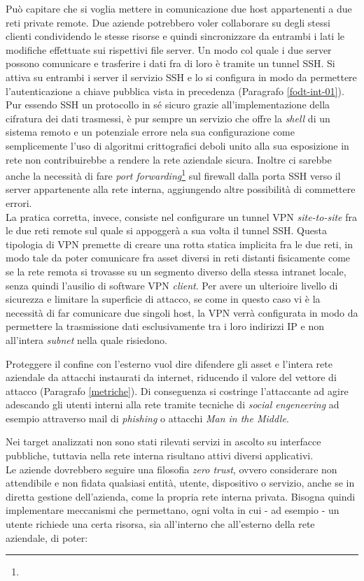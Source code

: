 \documentclass[target=bach,aauheader=]{thud}
\begin{document}
Può capitare che si voglia mettere in comunicazione due host appartenenti a due reti private remote. Due aziende potrebbero voler collaborare su degli stessi clienti condividendo le stesse risorse e quindi sincronizzare da entrambi i lati le modifiche effettuate sui rispettivi file server. Un modo col quale i due server possono comunicare e trasferire i dati fra di loro è tramite un tunnel SSH. Si attiva su entrambi i server il servizio SSH e lo si configura in modo da permettere l'autenticazione a chiave pubblica vista in precedenza (Paragrafo \ref{fodt-int-01}). Pur essendo SSH un protocollo in sé sicuro grazie all'implementazione della cifratura dei dati trasmessi, è pur sempre un servizio che offre la \textit{shell} di un sistema remoto e un potenziale errore nela sua configurazione come semplicemente l'uso di algoritmi crittografici deboli unito alla sua esposizione in rete non contribuirebbe a rendere la rete aziendale sicura. Inoltre ci sarebbe anche la necessità di fare \textit{port forwarding}\footnote{} sul firewall dalla porta SSH verso il server appartenente alla rete interna, aggiungendo altre possibilità di commettere errori.
\\ La pratica corretta, invece, consiste nel configurare un tunnel VPN \textit{site-to-site} fra le due reti remote sul quale si appoggerà a sua volta il tunnel SSH. Questa tipologia di VPN premette di creare una rotta statica implicita fra le due reti, in modo tale da poter comunicare fra asset diversi in reti distanti fisicamente come se la rete remota si trovasse su un segmento diverso della stessa intranet locale, senza quindi l'ausilio di software VPN \textit{client}. Per avere un ulterioire livello di sicurezza e limitare la superficie di attacco, se come in questo caso vi è la necessità di far comunicare due singoli host, la VPN verrà configurata in modo da permettere la trasmissione dati esclusivamente tra i loro indirizzi IP e non all'intera \textit{subnet} nella quale risiedono.

Proteggere il confine con l'esterno vuol dire difendere gli asset e l'intera rete aziendale da attacchi instaurati da internet, riducendo il valore del vettore di attacco (Paragrafo \ref{metriche}). Di conseguenza si costringe l'attaccante ad agire adescando gli utenti interni alla rete tramite tecniche di \textit{social engeneering} ad esempio attraverso mail di \textit{phishing} o attacchi \textit{Man in the Middle}.

Nei target analizzati non sono stati rilevati servizi in ascolto su interfacce pubbliche, tuttavia nella rete interna risultano attivi diversi applicativi.
\\Le aziende dovrebbero seguire una filosofia \textit{zero trust}, ovvero considerare non attendibile e non fidata qualsiasi entità, utente, dispositivo o servizio, anche se in diretta gestione dell'azienda, come la propria rete interna privata. Bisogna quindi implementare meccanismi che permettano, ogni volta in cui - ad esempio - un utente richiede una certa risorsa, sia all'interno che all'esterno della rete aziendale, di poter:
\end{document}
